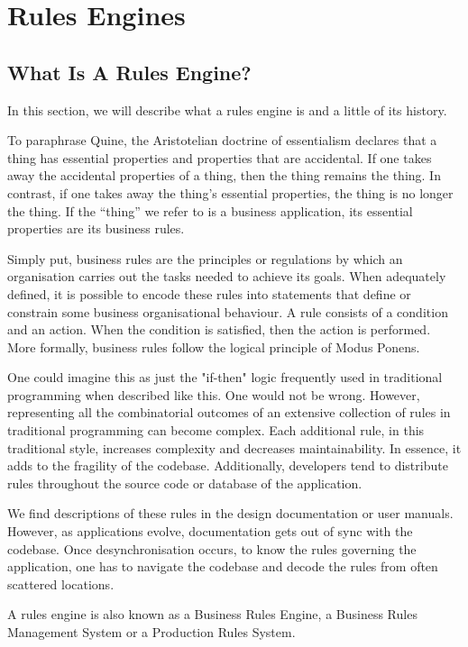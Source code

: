 \section{Rules Engines}

\subsection{What Is A Rules Engine?}
\label{section:what_is_a_rules_engine}

In this section, we will describe what a rules engine is and a little of its history.

To paraphrase Quine\cite{quine1953three}, the Aristotelian doctrine of essentialism declares that a thing has essential properties and properties that are accidental.
If one takes away the accidental properties of a thing, then the thing remains the thing.
In contrast, if one takes away the thing's essential properties, the thing is no longer the thing.
If the ``thing'' we refer to is a business application, its essential properties are its business rules.

Simply put, business rules are the principles or regulations by which an organisation carries out the tasks needed to achieve its goals.
When adequately defined, it is possible to encode these rules into statements that define or constrain some business organisational behaviour.
A rule consists of a condition and an action.
When the condition is satisfied, then the action is performed.
More formally, business rules follow the logical principle of Modus Ponens.

One could imagine this as just the "if-then" logic frequently used in traditional programming when described like this.
One would not be wrong. 
However, representing all the combinatorial outcomes of an extensive collection of rules in traditional programming can become complex.
Each additional rule, in this traditional style, increases complexity and decreases maintainability.
In essence, it adds to the fragility of the codebase.
Additionally, developers tend to distribute rules throughout the source code or database of the application.

We find descriptions of these rules in the design documentation or user manuals.
However, as applications evolve, documentation gets out of sync with the codebase.
Once desynchronisation occurs, to know the rules governing the application, one has to navigate the codebase and decode the rules from often scattered locations.

A rules engine is also known as a Business Rules Engine, a Business Rules Management System or a Production Rules System.

